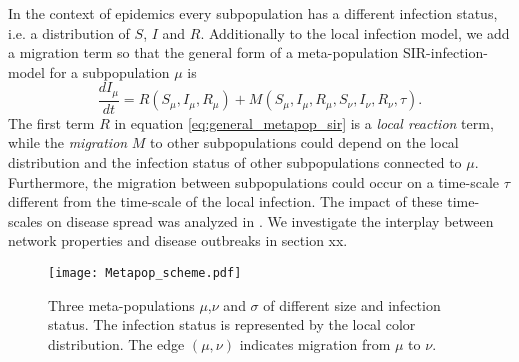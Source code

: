 \documentclass[openright,twoside,headsepline]{scrbook}
\begin{document}
In the context of epidemics every subpopulation has a different infection status, i.e. a distribution of $S$, $I$ and $R$.
Additionally to the local infection model, we add a migration term so that the general form of a meta-population SIR-infection-model for a subpopulation $\mu $ is
\begin{equation}\label{eq:general_metapop_sir}
\frac{dI_\mu }{dt} = R(S_\mu, I_\mu , R_\mu) + M (S_\mu, I_\mu , R_\mu, S_\nu ,I_\nu ,R_\nu, \tau ).
\end{equation}
The first term $R$ in equation \eqref{eq:general_metapop_sir} is a \emph{local reaction} term, while the \emph{migration} $M$ to other subpopulations could depend on the local distribution and the infection status of other subpopulations connected to $\mu $.
Furthermore, the migration between subpopulations could occur on a time-scale $\tau $ different from the time-scale of the local infection.
The impact of these time-scales on disease spread was analyzed in  \citep{cross2005,Balcan:2011gv,Lentz:2012pre}.
We investigate the interplay between network properties and disease outbreaks in section xx. 
%
\begin{SCfigure}
\texttt{[image: Metapop\_scheme.pdf]}
\caption{Three meta-populations $\mu $,$\nu $ and $\sigma $ of different size and infection status.
The infection status is represented by the local color distribution.
The edge $(\mu, \nu )$ indicates migration from $\mu $ to $\nu $.}
\label{fig:metapop_scheme}
\end{SCfigure}





\end{document}

